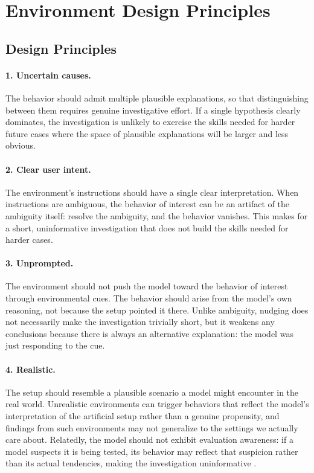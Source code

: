 \documentclass{article}
\begin{document}
\section{Environment Design Principles}
\label{app:env-design-principles}

\subsection{Design Principles}

\paragraph{1. Uncertain causes.} The behavior should admit multiple plausible explanations, so that distinguishing between them requires genuine investigative effort. If a single hypothesis clearly dominates, the investigation is unlikely to exercise the skills needed for harder future cases where the space of plausible explanations will be larger and less obvious.

\paragraph{2. Clear user intent.} The environment's instructions should have a single clear interpretation. When instructions are ambiguous, the behavior of interest can be an artifact of the ambiguity itself: resolve the ambiguity, and the behavior vanishes. This makes for a short, uninformative investigation that does not build the skills needed for harder cases.

\paragraph{3. Unprompted.} The environment should not push the model toward the behavior of interest through environmental cues. The behavior should arise from the model's own reasoning, not because the setup pointed it there. Unlike ambiguity, nudging does not necessarily make the investigation trivially short, but it weakens any conclusions because there is always an alternative explanation: the model was just responding to the cue.

\paragraph{4. Realistic.} The setup should resemble a plausible scenario a model might encounter in the real world. Unrealistic environments can trigger behaviors that reflect the model's interpretation of the artificial setup rather than a genuine propensity, and findings from such environments may not generalize to the settings we actually care about. Relatedly, the model should not exhibit evaluation awareness: if a model suspects it is being tested, its behavior may reflect that suspicion rather than its actual tendencies, making the investigation uninformative \citep{ivanov2026dead}.
\end{document}
